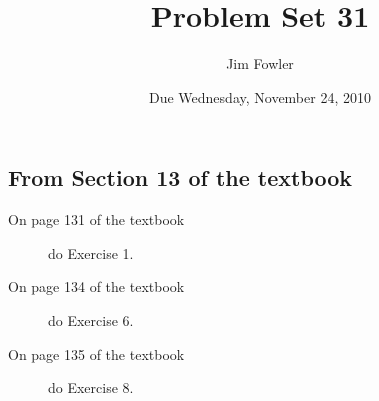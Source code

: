 \documentclass[12pt]{handout}
\author{Jim Fowler}
\title{Problem Set 31}
\date{Due Wednesday, November 24, 2010}
\begin{document}
\maketitle










\subsection*{From Section 13 of the textbook}



\begin{description}

\item[On page 131 of the textbook] do Exercise 1.

\item[On page 134 of the textbook] do Exercise 6.

\item[On page 135 of the textbook] do Exercise 8.

\end{description}
\end{document}
